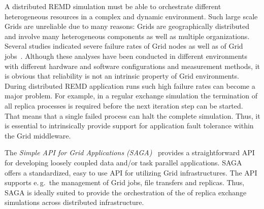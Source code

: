 \documentclass[times, 10pt,twocolumn]{article}
\newcommand{\kimnote}[1]{ {\textcolor{green} { ***JK: #1 }}}
\newcommand{\jhanote}[1]{ {\textcolor{red} { ***SJ: #1 }}}
\newcommand{\kimnote}[1]{}
\newcommand{\jhanote}[1]{}
\begin{document}
  

              
A distributed REMD simulation must be able to orchestrate different
heterogeneous resources in a complex and dynamic environment.  Such
large scale Grids are unreliable due to many reasons: Grids are
geographically distributed and involve many heterogeneous components
as well as multiple organizations.  Several studies indicated severe
failure rates of Grid nodes as well as of Grid
jobs~\cite{schroeder,10.1109/E-SCIENCE.2006.93,DBLP:conf/grid/KhaliliHOSC06}.
Although these analyses have been conducted in different environments
with different hardware and software configurations and measurement
methods, it is obvious that reliability is not an intrinsic property
of Grid environments.  During distributed REMD application runs such
high failure rates can become a major problem.  For example, in a
regular exchange simulation the termination of all replica processes
is required before the next iteration step can be started. That means
that a single failed process can halt the complete simulation.  Thus,
it is essential to intrinsically provide support for application fault
tolerance within the Grid middleware.


The \emph{Simple API for Grid Applications (SAGA)}~\cite{saga_gfd90}
provides a straightforward API for developing loosely coupled data
and/or task parallel applications.
SAGA offers a standardized, easy to use API for utilizing Grid
infrastructures. The API supports e.\,g.\ the management of Grid jobs,
file transfers and replicas. Thus, SAGA is ideally suited to provide
the orchestration of the of replica exchange simulations across
distributed infrastructure.
                                                         
\end{document}
